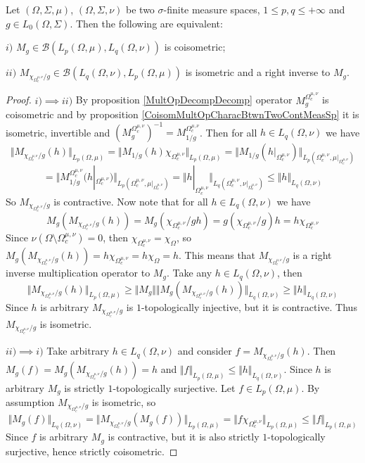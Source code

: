 \begin{proposition}\label{CoisomMultOpDescBtwnTwoMeasSp} Let $(\Omega,\Sigma,\mu)$, $(\Omega,\Sigma,\nu)$ be two $\sigma$-finite measure spaces, $1\leq p,q\leq +\infty$ and $g\in L_0(\Omega,\Sigma)$. Then the following are equivalent: 

$i)$ $M_g\in\mathcal{B}(L_p(\Omega,\mu),L_q(\Omega,\nu))$ is coisometric;

$ii)$ $M_{\chi_{\Omega_c^{\mu,\nu}}/g}\in\mathcal{B}(L_q(\Omega,\nu), L_p(\Omega,\mu))$ is isometric and a right inverse to $M_g$.
\end{proposition}
\begin{proof}
$i)$$\implies$$ ii)$ By proposition \ref{MultOpDecompDecomp} operator $M_g^{\Omega_c^{\mu,\nu}}$ is coisometric and by proposition \ref{CoisomMultOpCharacBtwnTwoContMeasSp} it is isometric, invertible and $(M_g^{\Omega_c^{\mu,\nu}})^{-1}=M_{1/g}^{\Omega_c^{\mu,\nu}}$. Then for all $h\in L_q(\Omega,\nu)$ we have
$$
\Vert M_{\chi_{\Omega_c^{\mu,\nu}}/g}(h)\Vert_{L_p(\Omega,\mu)}=
\Vert M_{1/g}(h)\chi_{\Omega_c^{\mu,\nu}}\Vert_{L_p(\Omega,\mu)}=
\Vert M_{1/g}(h|_{\Omega_c^{\mu,\nu}})\Vert_{L_p(\Omega_c^{\mu,\nu},\mu|_{\Omega_c^{\mu,\nu}})}$$
$$
=
\Vert M_{1/g}^{\Omega_c^{\mu,\nu}}(h|_{\Omega_c^{\mu,\nu}})\Vert_{L_p(\Omega_c^{\mu,\nu},\mu|_{\Omega_c^{\mu,\nu}})}
=\Vert h|_{\Omega_c^{\mu,\nu}}\Vert_{L_q(\Omega_c^{\mu,\nu},\nu|_{\Omega_c^{\mu,\nu}})}
\leq\Vert h\Vert_{L_q(\Omega,\nu)}
$$ 
So $M_{\chi_{\Omega_c^{\mu,\nu}}/g}$ is contractive. Now note that for all $h\in L_q(\Omega,\nu)$ we have 
$$
M_g(M_{\chi_{\Omega_c^{\mu,\nu}}/g}(h))
=M_g(\chi_{\Omega_c^{\mu,\nu}}/g  h)
=g (\chi_{\Omega_c^{\mu,\nu}}/g)   h
=h \chi_{\Omega_c^{\mu,\nu}}
$$
Since $\nu(\Omega\setminus\Omega_c^{\mu,\nu})=0$, then $\chi_{\Omega_c^{\mu,\nu}}=\chi_{\Omega}$, so $M_g(M_{\chi_{\Omega_c^{\mu,\nu}}/g}(h))=h \chi_{\Omega_c^{\mu,\nu}}=h \chi_{\Omega}=h$. This means that $M_{\chi_{\Omega_c^{\mu,\nu}}/g}$ is a right inverse multiplication operator to $M_g$. Take any $h\in L_q(\Omega,\nu)$, then
$$
\Vert M_{\chi_{\Omega_c^{\mu,\nu}}/g}(h)\Vert_{L_p(\Omega,\mu)}
\geq\Vert M_g\Vert\Vert M_g(M_{\chi_{\Omega_c^{\mu,\nu}}/g}(h))\Vert_{L_q(\Omega,\nu)}
\geq\Vert h\Vert_{L_q(\Omega,\nu)}
$$
Since $h$ is arbitrary $M_{\chi_{\Omega_c^{\mu,\nu}}/g}$ is $1$-topologically injective, but it is contractive. Thus $M_{\chi_{\Omega_c^{\mu,\nu}}/g}$ is isometric.

$ii)$$\implies$$ i)$ Take arbitrary $h\in L_q(\Omega,\nu)$ and consider $f=M_{\chi_{\Omega_c^{\mu,\nu}}/g}(h)$. Then $M_g(f)=M_g(M_{\chi_{\Omega_c^{\mu,\nu}}/g}(h))=h$ and $\Vert f\Vert_{L_p(\Omega,\mu)}\leq\Vert h\Vert_{L_q(\Omega,\nu)}$. Since $h$ is arbitrary $M_g$ is strictly $1$-topologically surjective. Let $f\in L_p(\Omega,\mu)$. By assumption $M_{\chi_{\Omega_c^{\mu,\nu}}/g}$ is isometric, so
$$
\Vert M_g(f)\Vert_{L_q(\Omega,\nu)}
=\Vert M_{\chi_{\Omega_c^{\mu,\nu}}/g}(M_g(f))\Vert_{L_p(\Omega,\mu)}
=\Vert f\chi_{\Omega_c^{\mu,\nu}}\Vert_{L_p(\Omega,\mu)}
\leq\Vert f\Vert_{L_p(\Omega,\mu)}
$$
Since $f$ is arbitrary $M_g$ is contractive, but it is also strictly $1$-topologically surjective, hence strictly coisometric.
\end{proof}

